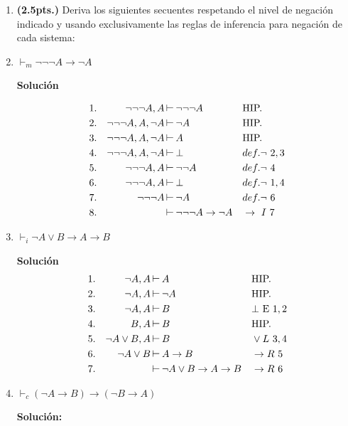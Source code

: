 \documentclass[11pt,letterpaper]{article}
\newcommand{\coso}{\mathbin{\rotatebox[origin=c]{270}{$\perp$}}}
\begin{document}
\begin{enumerate}
\item \textbf{(2.5pts.)} Deriva los siguientes secuentes respetando el nivel de negación indicado y usando exclusivamente las reglas de inferencia para negación de cada sistema:
  \be
\item $\vdash_m \neg\neg\neg A\to \neg A$
  
  \hfill\break
  {\bf Solución}

  \begin{align*}
    1.& & \neg\neg\neg A, A &\coso \neg\neg \neg A & &\text{HIP.}\\
    2.& & \neg\neg\neg A, A, \neg A &\coso \neg  A & &\text{HIP.}\\
    3.& & \neg\neg\neg A, A, \neg A &\coso   A & &\text{HIP.}\\
    4.& & \neg\neg\neg A, A, \neg A &\coso   \bot & &def. \neg\ 2,3\\
    5.& & \neg\neg\neg A, A &\coso \neg \neg A & &def.\neg\ 4\\
    6.& & \neg\neg\neg A, A &\coso \bot & &def.\neg\ 1,4\\
    7.& & \neg\neg\neg A &\coso \neg A & &def.\neg\ 6\\
    8.& & &\coso \neg\neg\neg A \rightarrow \neg A & &\rightarrow\ I\ 7\\
  \end{align*}
\item $\vdash_i \neg A \lor B\to A\to B$

  \hfill\break
  {\bf Solución}
  \begin{align*}
    1.& & \neg A, A&\coso A & &\text{HIP.}\\
    2.& & \neg A, A&\coso \neg A & &\text{HIP.}\\
    3.& & \neg A, A&\coso B & &\text{$\bot$ E}\ 1,2\\
    4.& & B, A&\coso B & &\text{HIP.}\\
    5.& & \neg A\lor B, A&\coso B & &\lor L\ 3,4\\
    6.& & \neg A\lor B&\coso A\rightarrow B & &\rightarrow R\ 5\\
    7.& & &\coso\neg A\lor B\rightarrow A\rightarrow B & &\rightarrow R\ 6\\    
  \end{align*}
\item $\vdash_c (\neg A \to B) \to (\neg B\to A)$

  \hfill\break  
  {\bf Solución:}


\end{enumerate}
\end{document}
